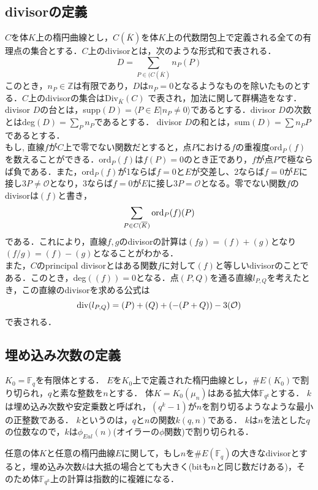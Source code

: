 \subsection{divisorの定義}
$C$を体$K$上の楕円曲線とし，$C(\overline{K})$を体$K$上の代数閉包上で定義される全ての有理点の集合とする．$C$上のdivisorとは，次のような形式和で表される．
\[
D=\sum\limits_{P\in (C(\overline{K})}n_P(P)
\]
このとき，$n_P\in \mathbb {Z}$は有限であり，$D$は$n_P=0$となるようなものを除いたものとする．$C$上のdivisorの集合はDiv$_{\overline{K}}(C)$
で表され，加法に関して群構造をなす．divisor $D$の台とは，supp$(D) = \langle P \in E|n_P \neq 0 \rangle$であるとする．divisor $D$の次数とはdeg$(D)=\sum\limits_{P}n_P$であるとする． divisor $D$の和とは，sum$(D)=\sum n_PP$であるとする．\\
もし, 直線$f$が$C$上で零でない関数だとすると，点$P$における$f$の重複度ord$_P(f)$を数えることができる．ord$_P(f)$は$f(P)=0$のとき正であり，$f$が点$P$で極ならば負である．また，ord$_P(f)$が1ならば$f=0$と$E$が交差し、2ならば$f=0$が$E$に接し$3P\neq \mathcal{O}$となり，3ならば$f=0$が$E$に接し$3P=\mathcal{O}$となる。零でない関数$f$のdivisorは$(f)$と書き，
\[
\sum\limits_{P\in C(\overline K)}{\rm ord}_P(f)(P)
\]
である．これにより，直線$f,g$のdivisorの計算は$(fg)=(f)+(g)$となり$(f/g)=(f)-(g)$となることがわかる．\\
また，$C$のprincipal divisorとはある関数$f$に対して$(f)$と等しいdivisorのことである．このとき，deg$((f))=0$となる．点$(P,Q)$を通る直線$l_{P,Q}$を考えたとき，この直線のdivisorを求める公式は
\[
{\rm div}(l_{P,Q})=(P)+(Q)+(-(P+Q))-3(\mathcal{O})
\]
で表される．
\par
\subsection{埋め込み次数の定義}
$K _0 = \mathbb{F} _q$を有限体とする．
$E$を$K _0$上で定義された楕円曲線とし，$\# E(K _0)$で割り切られ，$q$と素な整数を$n$とする．
体$K = K _0 (\mu _n)$はある拡大体$\mathbb{F} _{q ^{k}}$とする．
$k$は埋め込み次数や安定乗数と呼ばれ，$(q ^k -1)$が$n$を割り切るようなような最小の正整数である．
$k$というのは，$q$と$n$の関数$k(q, n)$である．
$k$は$n$を法とした$q$の位数なので，$k$は$\phi  _{Eul} (n)$(オイラーの$\phi$関数)で割り切られる．
\par
任意の体$K$と任意の楕円曲線$E$に関して，もし$n$を$\# E(\mathbb{F} _q)$の大きなdivisorとすると，埋め込み次数$k$は大抵の場合とても大きく(bitも$n$と同じ数だけある)，そのため体$\mathbb{F} _{q ^k}$上の計算は指数的に複雑になる．\\
\par
